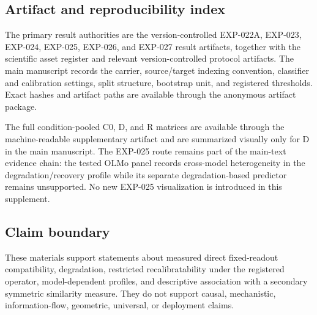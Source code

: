 \subsection{Artifact and reproducibility index}
The primary result authorities are the version-controlled EXP-022A, EXP-023, EXP-024, EXP-025, EXP-026, and EXP-027 result artifacts, together with the scientific asset register and relevant version-controlled protocol artifacts. The main manuscript records the carrier, source/target indexing convention, classifier and calibration settings, split structure, bootstrap unit, and registered thresholds. Exact hashes and artifact paths are available through the anonymous artifact package.

The full condition-pooled C0, D, and R matrices are available through the machine-readable supplementary artifact and are summarized visually only for D in the main manuscript. The EXP-025 route remains part of the main-text evidence chain: the tested OLMo panel records cross-model heterogeneity in the degradation/recovery profile while its separate degradation-based predictor remains unsupported. No new EXP-025 visualization is introduced in this supplement.

\subsection{Claim boundary}
These materials support statements about measured direct fixed-readout compatibility, degradation, restricted recalibratability under the registered operator, model-dependent profiles, and descriptive association with a secondary symmetric similarity measure. They do not support causal, mechanistic, information-flow, geometric, universal, or deployment claims.
